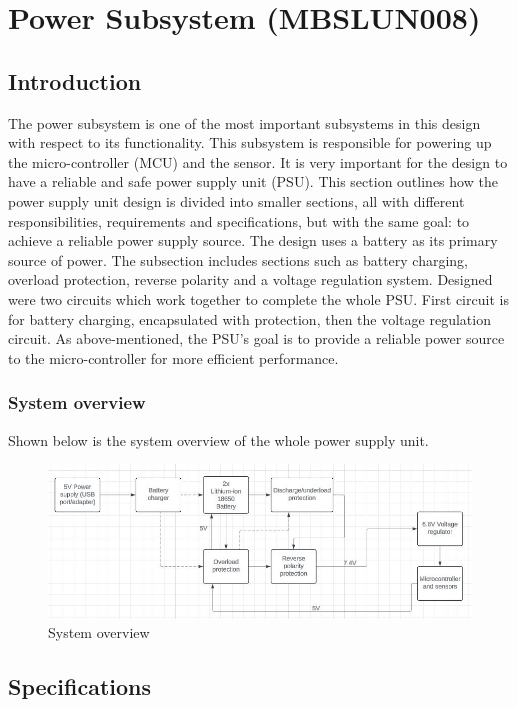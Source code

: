 \documentclass[class=report,11pt,crop=false]{standalone}
\begin{document}
	\chapter{Power Subsystem (MBSLUN008)}
	\section{Introduction}
	The power subsystem is one of the most important subsystems in this design with respect to its functionality. This subsystem is responsible for powering up the micro-controller (MCU) and the sensor. It is very important for the design to have a reliable and safe power supply unit (PSU). This section outlines how the power supply unit design is divided into smaller sections, all with different responsibilities, requirements and specifications, but with the same goal: to achieve a reliable power supply source. The design uses a battery as its primary source of power. The subsection includes sections such as battery charging, overload protection, reverse polarity and a voltage regulation system. Designed were two circuits which work together to complete the whole PSU. First circuit is for battery charging, encapsulated with protection, then the voltage regulation circuit. As above-mentioned, the PSU's goal is to provide a reliable power source to the micro-controller for more efficient performance. 
	
	\subsection{System overview}
	
	Shown below is the system overview of the whole power supply unit. 
	
	\begin{figure}[h!]
		\centering
		\includegraphics[width=0.8\linewidth]{Figures/flow diagram.jpg}
		\caption{System overview}
		\label{fig:P1}
	\end{figure}
	
	\section{Specifications}
\end{document}
